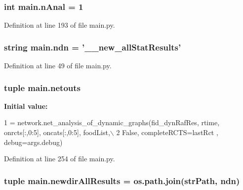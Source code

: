 \hypertarget{a00153_ae7ca1c378927da05feb71e5a9f775afb}{
\subsubsection[{n\+Anal}]{\setlength{\rightskip}{0pt plus 5cm}int main.\+n\+Anal = 1}}\label{a00153_ae7ca1c378927da05feb71e5a9f775afb}


Definition at line 193 of file main.\+py.

\hypertarget{a00153_acaa3f6fffb18a543c7c04d985e77fa6f}{
\subsubsection[{ndn}]{\setlength{\rightskip}{0pt plus 5cm}string main.\+ndn = '\+\_\+\_\+new\+\_\+all\+Stat\+Results'}}\label{a00153_acaa3f6fffb18a543c7c04d985e77fa6f}


Definition at line 49 of file main.\+py.

\hypertarget{a00153_a02c2194d4e56d3d8c6d2c204a8017e3a}{
\subsubsection[{netouts}]{\setlength{\rightskip}{0pt plus 5cm}tuple main.\+netouts}}\label{a00153_a02c2194d4e56d3d8c6d2c204a8017e3a}
{\bfseries Initial value\+:}
\begin{DoxyCode}
1 = network.net\_analysis\_of\_dynamic\_graphs(fid\_dynRafRes, rtime, onrcts[:,0:5], oncats[:,0:5], foodList,\(\backslash\)
2                                                                                                                                                                 
         \textcolor{keyword}{False}, completeRCTS=lastRct , debug=args.debug)
\end{DoxyCode}


Definition at line 254 of file main.\+py.

\hypertarget{a00153_af73b43f5468097ae9443adeb6010a75c}{
\subsubsection[{newdir\+All\+Results}]{\setlength{\rightskip}{0pt plus 5cm}tuple main.\+newdir\+All\+Results = os.\+path.\+join({\bf str\+Path}, {\bf ndn})}}\label{a00153_af73b43f5468097ae9443adeb6010a75c}


